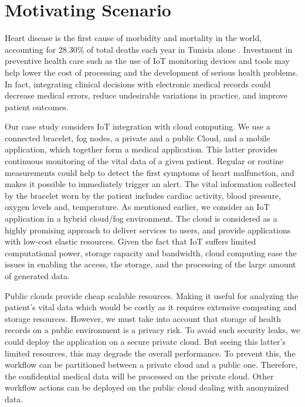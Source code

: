 \section{Motivating Scenario}
Heart disease is the first cause of morbidity and mortality in the world, accounting for 28.30\% of total deaths each year in Tunisia alone \cite{Organization2014}. Investment in preventive health care such as the use of IoT monitoring devices and tools may help lower the cost of processing and the development of serious health problems. In fact, integrating clinical decisions with electronic medical records could decrease medical errors, reduce undesirable variations in practice, and improve patient outcomes.

Our case study considers IoT integration with cloud computing. We use a connected bracelet, fog nodes, a private and a public Cloud, and a mobile application, which together form a medical application. This latter provides continuous monitoring of the vital data of a given patient. Regular or routine measurements could help to detect the first symptoms of heart malfunction, and makes it possible to immediately trigger an alert. The vital information collected by the bracelet worn by the patient includes cardiac activity, blood pressure, oxygen levels and, temperature. As mentioned earlier, we consider an IoT application in a hybrid cloud/fog environment. The cloud \cite{zhang2010cloud} is considered as a highly promising approach to deliver services to users, and provide applications with low-cost elastic resources. Given the fact that IoT  suffers limited computational power, storage capacity and bandwidth, cloud computing ease the issues in enabling the access, the storage, and the processing of the large amount of generated data.

Public clouds provide cheap scalable resources. Making it useful for analyzing the patient's vital data which would be costly as it requires extensive computing and storage resources. However, we must take into account that storage of health records on a public environment is a privacy risk. To avoid such security leaks, we could deploy the application on a secure private cloud. But seeing this latter's limited resources, this may degrade the overall performance. To prevent this, the workflow can be partitioned between a private cloud and a public one. Therefore, the confidential medical data will be processed on the private cloud. Other workflow actions can be deployed on the public cloud dealing with anonymized data.

